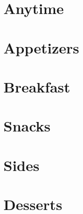 \documentclass{book}
\begin{document}
\tableofcontents
\chapter{Anytime}



\chapter{Appetizers}


\chapter{Breakfast}

\chapter{Snacks}

\chapter{Sides}

\chapter{Desserts}



\clearpage

\end{document}
